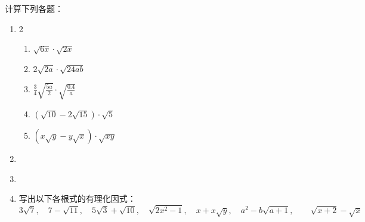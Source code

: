 \begin{ex}
    计算下列各题：
\begin{enumerate}
    \item \begin{multicols}{2}
\begin{enumerate}
    \item $\sqrt{6x}\cdot \sqrt{2x}$
    \item $2\sqrt{2a}\cdot \sqrt{24ab}$
    \item $\frac{3}{4}\sqrt{\frac{5a}{2}}\cdot \sqrt{\frac{0.4}{a}}$
    \item $\left(\sqrt{10}-2\sqrt{15}\right)\cdot \sqrt{5}$
    \item $\left(x\sqrt{y}-y\sqrt{x}\right)\cdot \sqrt{xy}$
\end{enumerate}
    \end{multicols}
\item \begin{enumerate}
\end{enumerate}

\item \begin{enumerate}
\end{enumerate}

\item 写出以下各根式的有理化因式：
\[3\sqrt{7},\quad 7-\sqrt{11},\quad 5\sqrt{3}+\sqrt{10},\quad \sqrt{2x^2-1},\quad x+x\sqrt{y},\quad a^2-b\sqrt{a+1},\qquad \sqrt{x+2}-\sqrt{x}\]
\end{enumerate}
\end{ex}

